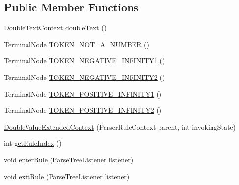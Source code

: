 \subsection*{Public Member Functions}
\begin{DoxyCompactItemize}
\item 
\hyperlink{classgov_1_1nasa_1_1jpf_1_1inspector_1_1server_1_1expression_1_1parser_1_1_expression_grammar_parser_1_1_double_text_context}{Double\+Text\+Context} \hyperlink{classgov_1_1nasa_1_1jpf_1_1inspector_1_1server_1_1expression_1_1parser_1_1_expression_grammar_paf529e59fbe08e921d008fd67634bb19c_aac2fd136ecfac2b7610177182e65f5d1}{double\+Text} ()
\item 
Terminal\+Node \hyperlink{classgov_1_1nasa_1_1jpf_1_1inspector_1_1server_1_1expression_1_1parser_1_1_expression_grammar_paf529e59fbe08e921d008fd67634bb19c_a8e716dd2a9062046366b4b8b1dff19bf}{T\+O\+K\+E\+N\+\_\+\+N\+O\+T\+\_\+\+A\+\_\+\+N\+U\+M\+B\+ER} ()
\item 
Terminal\+Node \hyperlink{classgov_1_1nasa_1_1jpf_1_1inspector_1_1server_1_1expression_1_1parser_1_1_expression_grammar_paf529e59fbe08e921d008fd67634bb19c_ac96f0b5d023cc6b5fbe54ec734577526}{T\+O\+K\+E\+N\+\_\+\+N\+E\+G\+A\+T\+I\+V\+E\+\_\+\+I\+N\+F\+I\+N\+I\+T\+Y1} ()
\item 
Terminal\+Node \hyperlink{classgov_1_1nasa_1_1jpf_1_1inspector_1_1server_1_1expression_1_1parser_1_1_expression_grammar_paf529e59fbe08e921d008fd67634bb19c_ad0ea6c9654098703a907d8c4f14f4100}{T\+O\+K\+E\+N\+\_\+\+N\+E\+G\+A\+T\+I\+V\+E\+\_\+\+I\+N\+F\+I\+N\+I\+T\+Y2} ()
\item 
Terminal\+Node \hyperlink{classgov_1_1nasa_1_1jpf_1_1inspector_1_1server_1_1expression_1_1parser_1_1_expression_grammar_paf529e59fbe08e921d008fd67634bb19c_a37aeafab267e0c838a351e9ae49d0d86}{T\+O\+K\+E\+N\+\_\+\+P\+O\+S\+I\+T\+I\+V\+E\+\_\+\+I\+N\+F\+I\+N\+I\+T\+Y1} ()
\item 
Terminal\+Node \hyperlink{classgov_1_1nasa_1_1jpf_1_1inspector_1_1server_1_1expression_1_1parser_1_1_expression_grammar_paf529e59fbe08e921d008fd67634bb19c_a2ebe09286153f06f7502936095ca8eb9}{T\+O\+K\+E\+N\+\_\+\+P\+O\+S\+I\+T\+I\+V\+E\+\_\+\+I\+N\+F\+I\+N\+I\+T\+Y2} ()
\item 
\hyperlink{classgov_1_1nasa_1_1jpf_1_1inspector_1_1server_1_1expression_1_1parser_1_1_expression_grammar_paf529e59fbe08e921d008fd67634bb19c_a5dd5f7f01ea7739ecb8283e20faf38e0}{Double\+Value\+Extended\+Context} (Parser\+Rule\+Context parent, int invoking\+State)
\item 
int \hyperlink{classgov_1_1nasa_1_1jpf_1_1inspector_1_1server_1_1expression_1_1parser_1_1_expression_grammar_paf529e59fbe08e921d008fd67634bb19c_a87de56d3e889f649040486a9487d0deb}{get\+Rule\+Index} ()
\item 
void \hyperlink{classgov_1_1nasa_1_1jpf_1_1inspector_1_1server_1_1expression_1_1parser_1_1_expression_grammar_paf529e59fbe08e921d008fd67634bb19c_afa571295d7042c18ec976c7ac428a882}{enter\+Rule} (Parse\+Tree\+Listener listener)
\item 
void \hyperlink{classgov_1_1nasa_1_1jpf_1_1inspector_1_1server_1_1expression_1_1parser_1_1_expression_grammar_paf529e59fbe08e921d008fd67634bb19c_ae9ec300224bf18cb04a42774346cae9e}{exit\+Rule} (Parse\+Tree\+Listener listener)
\end{DoxyCompactItemize}
